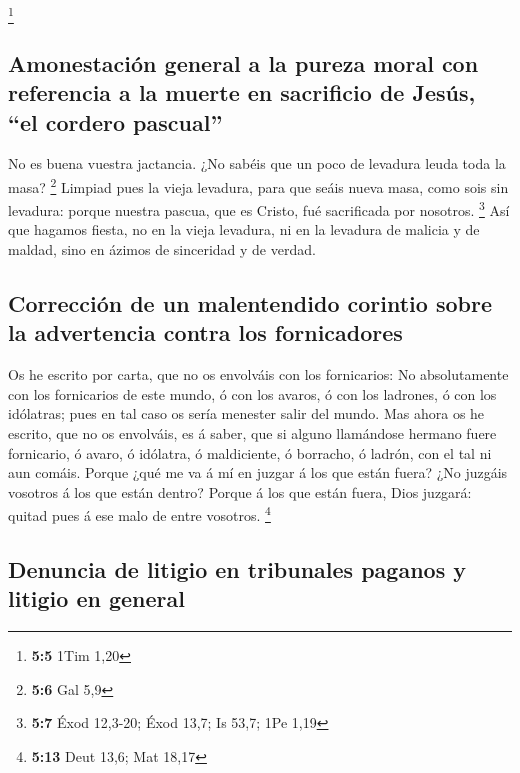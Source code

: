 \footnote{\textbf{5:5} 1Tim 1,20}

\hypertarget{amonestaciuxf3n-general-a-la-pureza-moral-con-referencia-a-la-muerte-en-sacrificio-de-jesuxfas-el-cordero-pascual}{%
\subsection{Amonestación general a la pureza moral con referencia a la
muerte en sacrificio de Jesús, ``el cordero
pascual''}\label{amonestaciuxf3n-general-a-la-pureza-moral-con-referencia-a-la-muerte-en-sacrificio-de-jesuxfas-el-cordero-pascual}}

 No es buena vuestra jactancia. ¿No sabéis que un poco de
levadura leuda toda la masa? \footnote{\textbf{5:6} Gal 5,9}
 Limpiad pues la vieja levadura, para que seáis nueva
masa, como sois sin levadura: porque nuestra pascua, que es Cristo, fué
sacrificada por nosotros. \footnote{\textbf{5:7} Éxod 12,3-20; Éxod
  13,7; Is 53,7; 1Pe 1,19}  Así que hagamos fiesta, no en
la vieja levadura, ni en la levadura de malicia y de maldad, sino en
ázimos de sinceridad y de verdad.

\hypertarget{correcciuxf3n-de-un-malentendido-corintio-sobre-la-advertencia-contra-los-fornicadores}{%
\subsection{Corrección de un malentendido corintio sobre la advertencia
contra los
fornicadores}\label{correcciuxf3n-de-un-malentendido-corintio-sobre-la-advertencia-contra-los-fornicadores}}

 Os he escrito por carta, que no os envolváis con los
fornicarios:  No absolutamente con los fornicarios de
este mundo, ó con los avaros, ó con los ladrones, ó con los idólatras;
pues en tal caso os sería menester salir del mundo.  Mas
ahora os he escrito, que no os envolváis, es á saber, que si alguno
llamándose hermano fuere fornicario, ó avaro, ó idólatra, ó maldiciente,
ó borracho, ó ladrón, con el tal ni aun comáis.  Porque
¿qué me va á mí en juzgar á los que están fuera? ¿No juzgáis vosotros á
los que están dentro?  Porque á los que están fuera, Dios
juzgará: quitad pues á ese malo de entre vosotros. \footnote{\textbf{5:13}
  Deut 13,6; Mat 18,17}

\hypertarget{denuncia-de-litigio-en-tribunales-paganos-y-litigio-en-general}{%
\subsection{Denuncia de litigio en tribunales paganos y litigio en
general}\label{denuncia-de-litigio-en-tribunales-paganos-y-litigio-en-general}}

